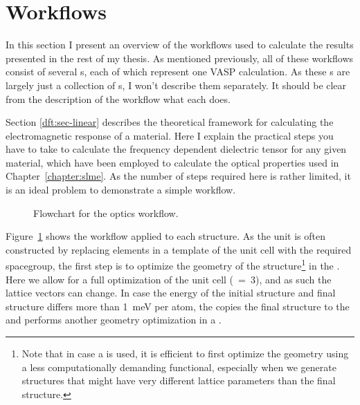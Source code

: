 \begin{refsection}
\begin{itemize}
\end{itemize} 
 
\section{Workflows} \label{automation:sec-workflows} 
 
In this section I present an overview of the workflows used to calculate the 
results presented in the rest of my thesis. As mentioned previously, all of 
these workflows consist of several s, each of which represent 
one VASP calculation. As these s are largely just a 
collection of s, I won't describe them separately. It should be 
clear from the description of the workflow what each  does. 
 
 
Section \ref{dft:sec-linear} describes the theoretical framework for 
calculating the electromagnetic response of a material. Here I explain the 
practical steps you have to take to calculate the frequency dependent 
dielectric tensor for any given material, which have been employed to 
calculate the optical properties used in Chapter~\ref{chapter:slme}. As the 
number of steps required here is rather limited, it is an ideal problem to 
demonstrate a simple workflow. 
 
\begin{figure}[ht] 
 
\caption{\label{automation:fig-optics} Flowchart for the optics workflow.} 
\end{figure} 
 
Figure~\ref{automation:fig-optics} shows the workflow applied to each 
structure. As the unit is often constructed by replacing elements in a 
template of the unit cell with the required spacegroup, the first step is to 
optimize the geometry of the structure\footnote{Note that in case a 
 is used, it is efficient to first 
optimize the geometry using a less computationally demanding functional, 
especially when we generate structures that might have very different lattice 
parameters than the final structure.} in the . Here we allow 
for a full optimization of the unit cell (~=~3), and as such the 
lattice vectors can change. In case the energy of the initial structure and 
final structure differs more than 1~\si{\milli\electronvolt} per atom, the 
 copies the final structure 
 to the  and performs another geometry optimization 
in a . 
 

\end{refsection}
